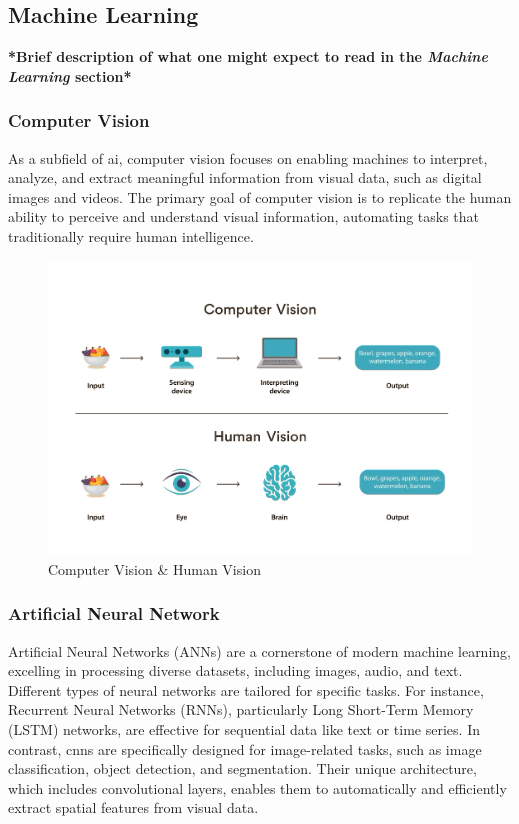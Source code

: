 \subsection{Machine Learning}

\textbf{*Brief description of what one might expect to read in the \textit{Machine Learning} section*}

\subsubsection*{Computer Vision}


As a subfield of \gls{ai}, computer vision focuses on enabling machines to interpret, analyze, and extract meaningful information from visual data, such as digital images and videos. The primary goal of computer vision is to replicate the human ability to perceive and understand visual information, automating tasks that traditionally require human intelligence. \cite{google:vision, microsoft:vision}

\begin{figure}[h!]
    \centering
    \includegraphics[width=0.75\linewidth]{figures//theory/computer-vision.png}
    \caption{Computer Vision \& Human Vision}
    \label{fig:computer-vision}
\end{figure}

\subsubsection*{Artificial Neural Network}

Artificial Neural Networks (ANNs) are a cornerstone of modern machine learning, excelling in processing diverse datasets, including images, audio, and text. Different types of neural networks are tailored for specific tasks. For instance, Recurrent Neural Networks (RNNs), particularly Long Short-Term Memory (LSTM) networks, are effective for sequential data like text or time series. In contrast, \glspl{cnn} are specifically designed for image-related tasks, such as image classification, object detection, and segmentation. Their unique architecture, which includes convolutional layers, enables them to automatically and efficiently extract spatial features from visual data. \cite{geeksforgeeks:cnn} \\

